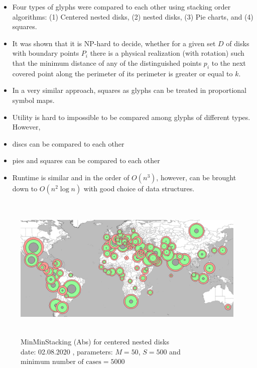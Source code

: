 \documentclass[a4paper,11pt]{article}
\begin{document}
\begin{itemize}
  \item Four types of glyphs were compared to each other using stacking order algorithms: (1) Centered nested disks, (2) nested disks, (3) Pie charts, and (4) squares.
  \item It was shown that it is NP-hard to decide, whether for a given set $D$ of disks with boundary points $P_i$ there is a physical realization (with rotation) such that the minimum distance of any of the distinguished points $p_i$ to the next covered point along the perimeter of its perimeter is greater or equal to $k$.
  \item In a very similar approach, squares as glyphs can be treated in proportional symbol maps.
  \item Utility is hard to impossible to be compared among glyphs of different types. However,
  \item discs can be compared to each other
  \item pies and squares can be compared to each other
  \item Runtime is similar and in the order of $O(n^3)$, however, can be brought down to $O(n^2 \log n)$ with good choice of data structures.
\end{itemize}



\newpage
\begin{figure}[h]
  \centering
  \includegraphics[height=7cm]{assets/MinMinAbsEval}
  \caption{MinMinStacking (Abs) for centered nested disks\\
  date: 02.08.2020  , parameters: $M=50$, $S=500$ and $\text{minimum number of cases}=5000$  }
\end{figure}
\end{document}
